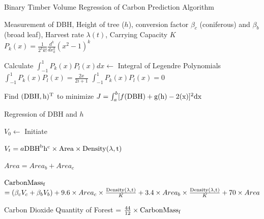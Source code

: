 \documentclass{mcmthesis}
\numberwithin{figure}{section}
\numberwithin{table}{section}
\numberwithin{equation}{section}
\begin{document}
\begin{algorithm}[htbp]
    \caption{Binary Timber Volume Regression of Carbon Prediction Algorithm}\label{Binary Volume Algo}
    \begin{algorithmic}[1]
      \Require
        Measurement of DBH, Height of tree ($ h $), conversion factor 
        $ \beta_c $  (coniferous) and $ \beta_b $ (broad leaf), Harvest rate $ \lambda(t) $, Carrying Capacity $ K $  
        $ P_k(x) = \frac{1}{2^kk!}\frac{d^k}{dx_k^k}(x^2-1)^k $

        \quad \quad Calculate $ \int_{-1}^{1}P_k(x)P_l(x)dx \gets $ Integral of Legendre Polynomials
        $ \int_{-1}^1P_k(x)P_l(x) = \frac{2x}{2i+1} $
        \Else $ \int_{-1}^1P_k(x)P_l(x) = 0 $   
        \EndIf 
        \EndFor
        \EndFor
        \EndFor
        
        \noindent Find $ (\rm{DBH}, h)^T $ to minimize  $ J = \int_a^b[f(\rm{DBH})+g(h)-2(x)]^2dx $

        Regression of DBH and $ h $  

        $V_0 \gets$ Initiate

        $ V_t = a\rm{DBH}^bh^c\times Area\times \rm{Density}(\lambda, t)  $
        \EndFor

        \noindent$ Area = Area_b + Area_c $

        \noindent $ \rm{CarbonMass_f} $  $= (\beta_cV_c+\beta_bV_b)+9.6\times Area_c\times 
        \frac{\rm{Density}(\lambda,t)}{K}+3.4\times Area_b \times \frac{\rm{Density}(\lambda,t)}{K}+ 70\times Area$

        \Ensure
        Carbon Dioxide Quantity of Forest = $\frac{44}{12}\times\rm{CarbonMass_f}$ 
    \end{algorithmic}
  \end{algorithm}
  
\end{document}
